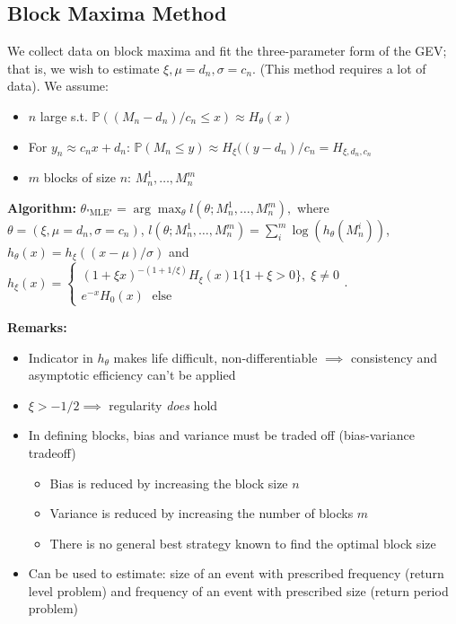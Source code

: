 \subsection*{Block Maxima Method}
We collect data on block maxima and fit the three-parameter form of the GEV;
that is, we wish to estimate $\xi, \mu=d_n, \sigma=c_n$. (This method requires a lot of data).
We assume:
\begin{itemize}
    \item $n$ large s.t. $\mathbb{P}((M_n-d_n)/c_n\leq x)\approx H_\theta (x)$
    \item For $y_n\approx c_n x+ d_n$: $\mathbb{P}(M_n\leq y)\approx H_\xi((y-d_n)/c_n=H_{\xi,d_n,c_n}$
    \item $m$ blocks of size $n$: $M^1_n,\dots,M^m_n$
\end{itemize}
\textbf{Algorithm:} $\theta_{\text{"MLE"}}=\arg\max_\theta l(\theta; M^1_n,\dots,M^m_n),$
where $\theta=(\xi, \mu=d_n, \sigma=c_n)$, $l(\theta; M^1_n,\dots,M^m_n)=\sum_i^m \log(h_\theta(M^i_n))$, $h_\theta(x)=h_\xi((x-\mu)/\sigma)$ and
$h_\xi(x)=
\begin{cases}
(1+\xi x)^{-(1+1/\xi)}H_\xi(x)1\{1+\xi>0\},\; \xi\neq 0\\
e^{-x}H_0(x)\; \text{ else}
\end{cases}$.

\textbf{Remarks:}
\begin{itemize}
    \item Indicator in $h_\theta$ makes life difficult, non-differentiable $\implies$ consistency and asymptotic efficiency can't be applied
    \item $\xi>-1/2\implies$ regularity \textit{does} hold
    \item In defining blocks, bias and variance must be traded off (bias-variance tradeoff)
    \begin{itemize}
        \item Bias is reduced by increasing the block size $n$
        \item Variance is reduced by increasing the number of blocks $m$
        \item There is no general best strategy known to find the optimal block size
    \end{itemize}
    \item Can be used to estimate: size of an event with prescribed frequency (return level problem) and frequency of an event with prescribed size (return period problem)
\end{itemize}


